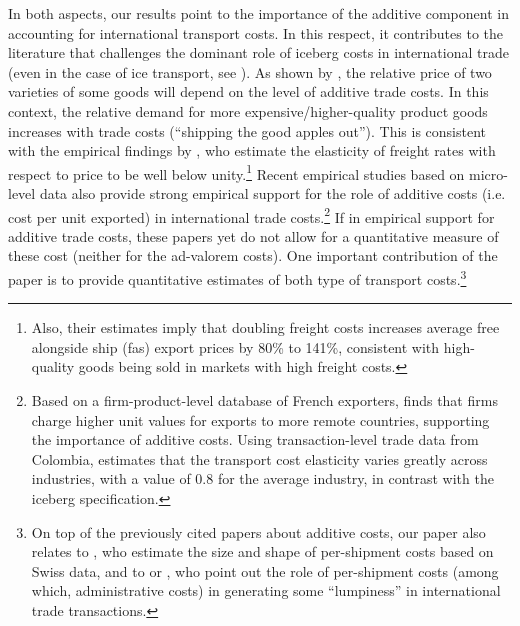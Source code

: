\documentclass[a4paper,11pt]{article}
\begin{document}
\smallskip
In both aspects, our results point to the importance of the additive component in accounting for international transport costs.
In this respect, it contributes to the literature that challenges the dominant role of iceberg costs in international trade (even in the case of ice transport, see \citealp{bosker2018ice}). As shown by \cite{alchian}, the relative price of two varieties of some goods will depend on the level of additive trade costs. In this context, the relative demand for more expensive/higher-quality product goods increases with trade costs (``shipping the good apples out''). This is consistent with the empirical findings by \cite{hummels_skiba}, who estimate the elasticity of freight rates with respect to price to be well below unity.\footnote{Also, their estimates imply that doubling freight costs increases average free alongside ship (fas) export prices by 80\% to 141\%, consistent with high-quality goods being sold in markets with high freight costs.}
Recent empirical studies based on micro-level data also provide strong empirical support for the role of additive costs (i.e. cost per unit exported) in international trade costs.\footnote{Based on a firm-product-level database of French exporters, \cite{martin2012} finds that firms charge higher unit values for exports to more remote countries, supporting the importance of additive costs.
Using transaction-level trade data from Colombia, \cite{Lashkaripour-2018} estimates that the transport cost elasticity varies greatly across industries, with a value of 0.8 for the average industry, in contrast with the iceberg specification.} If in empirical support for additive trade costs, these papers yet do not allow for a quantitative measure of these cost (neither for the ad-valorem costs). One important contribution of the paper is to provide quantitative estimates of both type of transport costs.\footnote{On top of the previously cited papers about additive costs, our paper also relates to \cite{Kropf-Saure-JIE-2016}, who estimate the size and shape of per-shipment costs based on Swiss data, and to \cite{Alessandria-et-al-AER-2010} or \cite{Hornok-et-al-JIE-2015, Hornok-et-al-RES-2015}, who point out the role of per-shipment costs (among which, administrative costs) in generating some ``lumpiness'' in international trade transactions.} \smallskip
\end{document}

